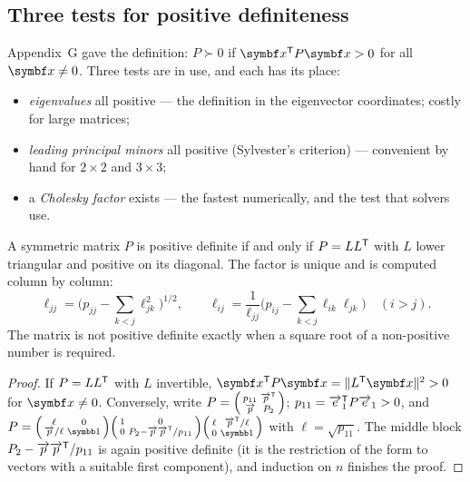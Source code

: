 \subsection{Three tests for positive definiteness}
Appendix~G gave the definition: $P \succ 0$ if $\vx^\T P\vx > 0$ for all $\vx \ne 0$. Three tests are in use, and each has its place:
\begin{itemize}
  \item \emph{eigenvalues} all positive — the definition in the eigenvector coordinates; costly for large matrices;
  \item \emph{leading principal minors} all positive (Sylvester's criterion) — convenient by hand for $2 \times 2$ and $3 \times 3$;
  \item a \emph{Cholesky factor} exists — the fastest numerically, and the test that solvers use.
\end{itemize}

\begin{theorem}
\label{thm:I-chol}
A symmetric matrix $P$ is positive definite if and only if $P = LL^{\mathsf{T}}$ with $L$ lower triangular and positive on its diagonal. The factor is unique and is computed column by column:
\begin{equation}\label{eq:I-chol}
  \ell_{jj} = \Big(p_{jj} - \sum_{k<j}\ell_{jk}^2\Big)^{1/2}, \qquad \ell_{ij} = \frac{1}{\ell_{jj}}\Big(p_{ij} - \sum_{k<j}\ell_{ik}\ell_{jk}\Big) \quad (i > j) .
\end{equation}
The matrix is not positive definite exactly when a square root of a non-positive number is required.
\end{theorem}
\begin{proof}
If $P = LL^{\mathsf{T}}$ with $L$ invertible, $\vx^\T P\vx = \|L^\T\vx\|^2 > 0$ for $\vx \ne 0$. Conversely, write $P = \begin{psmallmatrix}p_{11} & \overrightarrow{p}^{\mathsf{T}}\\ \overrightarrow{p} & P_2\end{psmallmatrix}$; $p_{11} = \overrightarrow{e}_1^{\mathsf{T}} P\overrightarrow{e}_1 > 0$, and $P = \begin{psmallmatrix}\ell & 0\\ \vec p/\ell & \Id\end{psmallmatrix}\begin{psmallmatrix}1 & 0\\ 0 & P_2 - \vec p\vec p^\T/p_{11}\end{psmallmatrix}\begin{psmallmatrix}\ell & \vec p^\T/\ell\\ 0 & \Id\end{psmallmatrix}$ with $\ell = \sqrt{p_{11}}$. The middle block $P_2 - \overrightarrow{p}\overrightarrow{p}^{\mathsf{T}}/p_{11}$ is again positive definite (it is the restriction of the form to vectors with a suitable first component), and induction on $n$ finishes the proof.
\end{proof}

